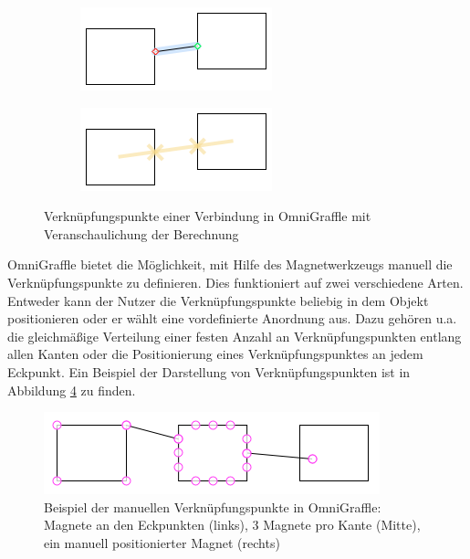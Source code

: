 \begin{figure}[hbt]
    \newcommand{\subfigurewidth}{0.5\textwidth}
    \newcommand{\graphicswidth}{0.8\linewidth}
    \begin{subfigure}{\subfigurewidth}
        \centering
        \includegraphics[width=\graphicswidth]{resources/omnigraffle-connection-points-a}
        \caption{}
        \label{fig:omnigraffle-connection-points-a}
    \end{subfigure}
    \begin{subfigure}{\subfigurewidth}
        \centering
        \includegraphics[width=\graphicswidth]{resources/omnigraffle-connection-points-b}
        \caption{}
        \label{fig:omnigraffle-connection-points-b}
    \end{subfigure}
    \caption{Verknüpfungspunkte einer Verbindung in OmniGraffle  mit Veranschaulichung der Berechnung }
    \label{fig:omnigraffle-connection-points}
\end{figure}

OmniGraffle bietet die Möglichkeit, mit Hilfe des Magnetwerkzeugs manuell die Verknüpfungspunkte zu definieren. Dies funktioniert auf zwei verschiedene Arten. Entweder kann der Nutzer die Verknüpfungspunkte beliebig in dem Objekt positionieren oder er wählt eine vordefinierte Anordnung aus. Dazu gehören u.a. die gleichmäßige Verteilung einer festen Anzahl an Verknüpfungspunkten entlang allen Kanten oder die Positionierung eines Verknüpfungspunktes an jedem Eckpunkt. Ein Beispiel der Darstellung von Verknüpfungspunkten ist in Abbildung \ref{fig:omnigraffle-magnets-example} zu finden.

\begin{figure}[hbt]
    \centering
    \includegraphics{resources/omnigraffle-magnets-example.png}
    \caption{Beispiel der manuellen Verknüpfungspunkte in OmniGraffle: Magnete an den Eckpunkten (links), 3 Magnete pro Kante (Mitte), ein manuell positionierter Magnet (rechts)}
    \label{fig:omnigraffle-magnets-example}
\end{figure}

